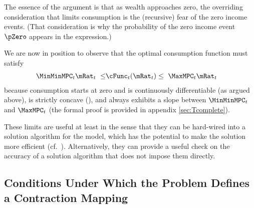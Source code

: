 \documentclass[BufferStockTheory]{subfiles}
\begin{document}
The essence of the argument is that as wealth approaches zero, the overriding
consideration that limits consumption is the (recursive) fear of the zero
income events.  (That consideration is why the probability of the zero
income event $\pZero$ appears in the expression.)  

We are now in position to observe that the optimal consumption function must satisfy
\begin{equation}\begin{gathered}\begin{aligned}
  \MinMinMPC_{t} \mRat_{t} ~ \leq &   \cFunc_{t}(\mRat_{t})  \leq  ~ \MaxMPC_{t} \mRat_{t} \label{eq:cBounds}
\end{aligned}\end{gathered}\end{equation}
because consumption starts at zero and is continuously
differentiable (as argued above), is strictly
concave (\cite{ckConcavity}), and always exhibits a
slope between $\MinMinMPC_{t}$ and $\MaxMPC_{t}$ (the formal proof is provided in appendix \ref{sec:Tcomplete}).

These limits are useful at least in the sense that they can be hard-wired into a solution algorithm for the model, which has the potential to make the solution more efficient (cf.\ \cite{cctwMoM}).  Alternatively, they can provide a useful check on the accuracy of a solution algorithm that does not impose them directly.

\begin{comment}
  If the \FHWC~does not hold, we make do with a less useful bound on the minimal MPC: It is
  weakly greater than zero, which follows from the logic in
  \ref{sec:cExists}; hence the `max' in \eqref{eq:MinMinMPCDef}.
\end{comment}

\hypertarget{Conditions-Under-Which-the-Problem-Defines-a-Contraction-Mapping}{}
\subsection{Conditions Under Which the Problem Defines a Contraction Mapping}

\label{subsec:contraction}
\end{document}
